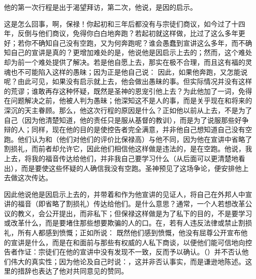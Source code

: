 他的第一次行程是出于渴望拜访，第二次，他说，是因的启示。\par

\par

这是怎么回事，啊，保禄！你起初和三年后都没有与宗徒们商议，如今过了十四年，反倒与他们商议，免得你白白地奔跑？若起初就这样做，比过了这么多年更好；若你不确知自己没有空跑，又为何奔跑呢？谁会愚蠢到宣讲这么多年，而不确知自己的宣讲是真的？更增加难处的是，他说他是因启示上去的；然而，这个难处却为前一个难处提供了解决。若是他自愿上去，那实在极不合理，而且这有福的灵魂也不可能陷入这样的愚昧；因为正是他自己说： 因此，如果他奔跑，又怎能说呢？由此可见，如果没有启示就上去，他会做出愚昧的事。但实际情况并没有这样的荒谬；谁敢再存这种怀疑，既然是圣神的恩宠引他上去？为此他加了一词，免得在问题解决之前，他被人判为愚昧；他深知这不是人的事，而是关乎现在和将来的深沉的天主眷顾。那么，他这次行程的原因是什么？正如他以前从上去，不是为了自己（因为他清楚知道，他的责任只是服从基督的教训），而是为了说服那些好争辩的人；同样，现在他的目的是使控告者完全满意，并非他自己想知道自己没有空跑。他们认为和（他们对他们的评价比保禄高）与他不同，因为他在宣讲中省略了割损礼，而前者却允许它，因此他们相信他这样做是违法的，是在空跑。他说，我上去，将我的福音传达给他们，并非我自己要学习什么（从后面可以更清楚地看出），而是要使这些怀疑的人确信我没有空跑。圣神预见了这场争论，便安排他上去做这次传达。\par

因此他说他是因启示上去的，并带着和作为他宣讲的见证人，将自己在外邦人中宣讲的福音（即省略了割损礼）传达给他们。是什么意思？通常，一个人若想改革公议的教义，会公开提出，而非私下；但保禄这样做是为了私下的目的，不是要学习或改革什么，而是要堵住那些想要欺骗的人的口。在，若有人违反法律或禁止割损礼，所有人都感到愤慨；正如所说： 既然他们感到愤慨，他没有屈尊公开宣布他的宣讲是什么，而是在和面前与那些有权威的人私下商谈，以便他们能可信地向控告者作证：宗徒们在他的宣讲中没有发现不一致，反而予以确认。（）并不否认他们伟大的真实性；因为他论及自己时说：，这并非否认事实，而是谦逊地陈述。这里的措辞也表达了他对共同意见的赞同。\par


